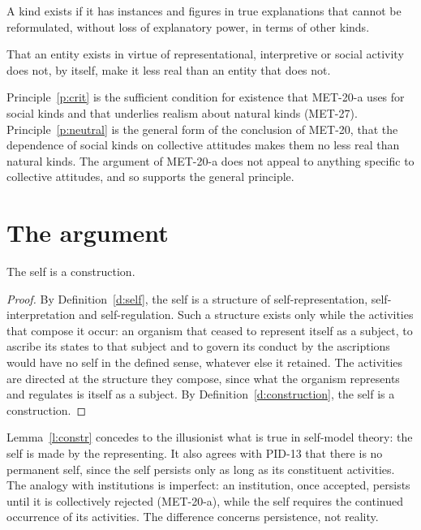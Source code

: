 \documentclass{situationist-preprint}
\begin{document}
\begin{principle}\label{p:crit}
A kind exists if it has instances and figures in true explanations that cannot be reformulated, without loss of explanatory power, in terms of other kinds.
\end{principle}

\begin{principle}\label{p:neutral}
That an entity exists in virtue of representational, interpretive or social activity does not, by itself, make it less real than an entity that does not.
\end{principle}

Principle~\ref{p:crit} is the sufficient condition for existence that MET-20-a uses for social kinds and that underlies realism about natural kinds (MET-27). Principle~\ref{p:neutral} is the general form of the conclusion of MET-20, that the dependence of social kinds on collective attitudes makes them no less real than natural kinds. The argument of MET-20-a does not appeal to anything specific to collective attitudes, and so supports the general principle.

\section{The argument}\label{s:arg}

\begin{lemma}\label{l:constr}
The self is a construction.
\end{lemma}

\begin{proof}
By Definition~\ref{d:self}, the self is a structure of self-representation, self-interpretation and self-regulation. Such a structure exists only while the activities that compose it occur: an organism that ceased to represent itself as a subject, to ascribe its states to that subject and to govern its conduct by the ascriptions would have no self in the defined sense, whatever else it retained. The activities are directed at the structure they compose, since what the organism represents and regulates is itself as a subject. By Definition~\ref{d:construction}, the self is a construction.
\end{proof}

Lemma~\ref{l:constr} concedes to the illusionist what is true in self-model theory: the self is made by the representing. It also agrees with PID-13 that there is no permanent self, since the self persists only as long as its constituent activities. The analogy with institutions is imperfect: an institution, once accepted, persists until it is collectively rejected (MET-20-a), while the self requires the continued occurrence of its activities. The difference concerns persistence, not reality.
\end{document}
